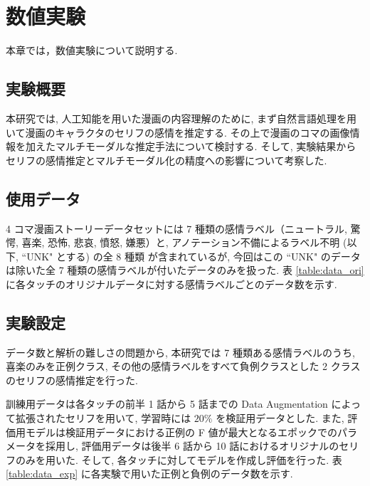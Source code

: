 \newpage
\changeindent{0cm}
\section{数値実験}
\changeindent{2cm}

本章では，数値実験について説明する.

\changeindent{0cm}
\subsection{実験概要}
\changeindent{2cm}

本研究では, 人工知能を用いた漫画の内容理解のために,
まず自然言語処理を用いて漫画のキャラクタのセリフの感情を推定する.
その上で漫画のコマの画像情報を加えたマルチモーダルな推定手法について検討する.
そして, 実験結果からセリフの感情推定とマルチモーダル化の精度への影響について考察した.

\changeindent{0cm}
\subsection{使用データ}
\changeindent{2cm}

4 コマ漫画ストーリーデータセットには 7 種類の感情ラベル（ニュートラル, 驚愕, 喜楽, 恐怖, 悲哀, 憤怒, 嫌悪）と, アノテーション不備によるラベル不明 (以下, ``UNK" とする) の全 8 種類
が含まれているが, 今回はこの ``UNK" のデータは除いた全 7 種類の感情ラベルが付いたデータのみを扱った. 表 \ref{table:data_ori} に各タッチのオリジナルデータに対する感情ラベルごとのデータ数を示す.

\changeindent{0cm}
\subsection{実験設定}
\changeindent{2cm}

データ数と解析の難しさの問題から, 本研究では 7 種類ある感情ラベルのうち,
喜楽のみを正例クラス, その他の感情ラベルをすべて負例クラスとした
2 クラスのセリフの感情推定を行った.

訓練用データは各タッチの前半 1 話から 5 話までの
Data Augmentation によって拡張されたセリフを用いて, 学習時には $20\%$ を検証用データとした.
また, 評価用モデルは検証用データにおける正例の F 値が最大となるエポックでのパラメータを採用し,
評価用データは後半 6 話から 10 話におけるオリジナルのセリフのみを用いた. そして, 各タッチに対してモデルを作成し評価を行った.
表 \ref{table:data_exp} に各実験で用いた正例と負例のデータ数を示す.



